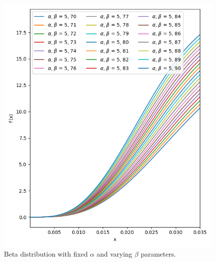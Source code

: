 \begin{figure}[!ht]%
    \centering
    \includegraphics[width=\linewidth]{images/beta2}
    \caption{Beta distribution with fixed $\alpha$ and varying $\beta$ parameters.}
    \label{fig:beta2}
\end{figure}%
